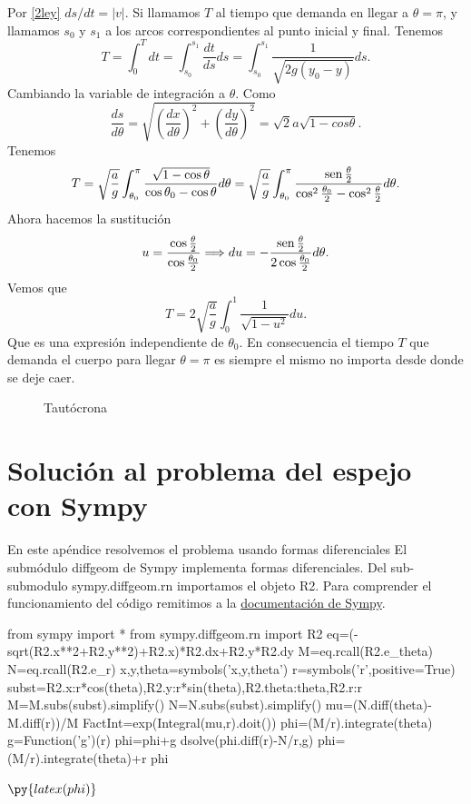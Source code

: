 \begin{subappendices}
  
Por \eqref{2ley} $ds/dt=|v|$. Si llamamos $T$ al tiempo que demanda en llegar a $\theta=\pi$, y llamamos  $s_0$ y $s_1$ a los arcos correspondientes al punto inicial
y final.  Tenemos
 \[T=\int_0^Tdt=\int_{s_0}^{s_1}\frac{dt}{ds}ds=\int_{s_0}^{s_1}\frac{1}{\sqrt{2g(y_0-y)}}ds.\]
Cambiando la variable de integración a $\theta$. Como 
\[
 \frac{ds}{d\theta}=\sqrt{\left(\frac{dx}{d\theta}\right)^2+\left(\frac{dy}{d\theta}\right)^2}=\sqrt{2}a\sqrt{1-cos\theta}.
\]
 Tenemos
\[T=\sqrt{\frac{a}{g}}\int_{\theta_0}^{\pi}\frac{\sqrt{1-\cos\theta}}{\cos\theta_0-\cos\theta}d\theta=
\sqrt{\frac{a}{g}}\int_{\theta_0}^{\pi}\frac{\sen\frac{\theta}{2}}{\cos^2\frac{\theta_0}{2}-\cos^2\frac{\theta}{2}}d\theta.
\]
Ahora hacemos la sustitución
\[u=\frac{\cos\frac{\theta}{2}}{\cos\frac{\theta_0}{2}}\Longrightarrow du=-\frac{\sen\frac{\theta}{2}}{2\cos\frac{\theta_0}{2}}d\theta.\]
Vemos que
\[
 T=2\sqrt{\frac{a}{g}}\int_0^1\frac{1}{\sqrt{1-u^2}}du.
\]
Que es una expresión independiente de $\theta_0$. En consecuencia el tiempo $T$ que demanda  el cuerpo para llegar $\theta=\pi$ es siempre el mismo no importa
desde donde se deje caer.

\begin{figure}[h]
\begin{center}
\end{center}\caption{Tautócrona}\label{fig:tautocrona}
\end{figure}

\section{Solución al problema del espejo con Sympy}
En este apéndice resolvemos el problema usando formas diferenciales
El submódulo diffgeom de Sympy implementa formas diferenciales. Del
sub-submodulo sympy.diffgeom.rn  importamos el objeto R2. 
Para comprender el funcionamiento del código remitimos a la 
\href{http://docs.sympy.org/latest/modules/diffgeom.html}{documentación de Sympy}.


\begin{pyblock}
from sympy import *
from sympy.diffgeom.rn import R2
eq=(-sqrt(R2.x**2+R2.y**2)+R2.x)*R2.dx+R2.y*R2.dy
M=eq.rcall(R2.e_theta)
N=eq.rcall(R2.e_r)
x,y,theta=symbols('x,y,theta')
r=symbols('r',positive=True)
subst={R2.x:r*cos(theta),R2.y:r*sin(theta),R2.theta:theta,R2.r:r}
M=M.subs(subst).simplify()
N=N.subs(subst).simplify()
mu=(N.diff(theta)-M.diff(r))/M
FactInt=exp(Integral(mu,r).doit())
phi=(M/r).integrate(theta)
g=Function('g')(r)
phi=phi+g
dsolve(phi.diff(r)-N/r,g)
phi=(M/r).integrate(theta)+r
phi
\end{pyblock}


$\py{latex(phi)}$

\end{subappendices}

  
  
%
